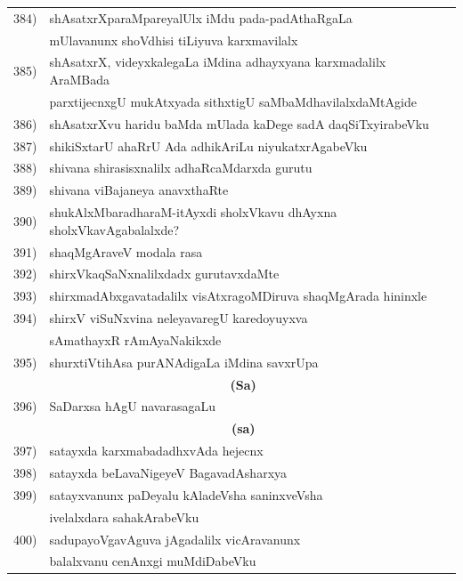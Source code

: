 \begin{longtable}{@{}cp{7.4cm}r}
 384) & shAsatxrXparaMpareyalUlx iMdu pada-padAthaRgaLa &  \\
      & mUlavanunx shoVdhisi tiLiyuva karxmavilalx & \pageref{page216}\\
 385) & shAsatxrX, videyxkalegaLa iMdina adhayxyana karxmadalilx AraMBada& \\
      & parxtijecnxgU mukAtxyada sithxtigU saMbaMdhavilalxdaMtAgide & \pageref{page40}\\
 386) & shAsatxrXvu haridu baMda mUlada kaDege sadA daqSiTxyirabeVku & \pageref{page142}\\
 387) & shikiSxtarU ahaRrU Ada adhikAriLu niyukatxrAgabeVku  & \pageref{page47b}\\
 388) & shivana shirasisxnalilx adhaRcaMdarxda gurutu & \pageref{page172a}\\
 389) & shivana viBajaneya anavxthaRte & \pageref{page126a}\\ 
 390) & shukAlxMbaradharaM-itAyxdi sholxVkavu dhAyxna sholxVkavAgabalalxde? & \pageref{page206a}\\
 391) & shaqMgAraveV modala rasa & \pageref{page227}\\
 392) & shirxVkaqSaNxnalilxdadx gurutavxdaMte & \pageref{page107}\\
 393) & shirxmadAbxgavatadalilx visAtxragoMDiruva shaqMgArada hininxle & \pageref{page228}\\
 394) & shirxV viSuNxvina neleyavaregU karedoyuyxva & \\
      &  sAmathayxR rAmAyaNakikxde & \pageref{page238b}\\
 395) & shurxtiVtihAsa purANAdigaLa iMdina savxrUpa & \pageref{page187}\\[0.3cm] 
      & \multicolumn{1}{c}{\textbf{(Sa)}} & \\[0.3cm]
 396) & SaDarxsa hAgU navarasagaLu & \pageref{page223}\\[0.3cm]
       & \multicolumn{1}{c}{\textbf{(sa)}} & \\[0.3cm] 
 397) & satayxda karxmabadadhxvAda hejecnx & \pageref{page76a} \\
 398) & satayxda beLavaNigeyeV BagavadAsharxya & \pageref{page72b}\\
 399) & satayxvanunx paDeyalu kAladeVsha saninxveVsha & \\
      & ivelalxdara sahakArabeVku & \pageref{page109}\\
400) & sadupayoVgavAguva jAgadalilx vicAravanunx & \\
     &  balalxvanu cenAnxgi muMdiDabeVku & \pageref{page248}\\ 

\end{longtable}

